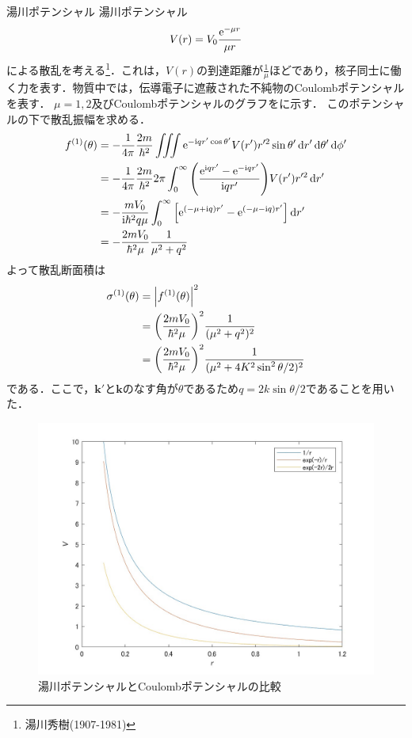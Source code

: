 \documentclass{report}
\begin{document}
 \begin{myex}{湯川ポテンシャル}{}
湯川ポテンシャル
\begin{align}
  V(r) = V_0 \frac{\mathrm{e}^{-\mu r}}{\mu r}
\end{align}
による散乱を考える\footnote{湯川秀樹(1907-1981)}．これは，$V(r)$の到達距離が$\frac{1}{\mu}$ほどであり，核子同士に働く力を表す．物質中では，伝導電子に遮蔽された不純物のCoulombポテンシャルを表す．
$\mu = 1,2$及びCoulombポテンシャルのグラフをに示す．
このポテンシャルの下で散乱振幅を求める．
\begin{align}
  f^{(1)}(\theta) &= -\frac{1}{4\pi} \frac{2m}{\hbar^2} \iiint \mathrm{e}^{-\mathrm{i} qr'\cos\theta'}V(r') r'^2 \sin\theta'\dd{r'}\dd{\theta'}\dd{\phi'}\\
  &= -\frac{1}{4\pi}\frac{2m}{\hbar^2} 2\pi \int_{0}^{\infty} \qty(\frac{\mathrm{e}^{\mathrm{i} qr'} - \mathrm{e}^{-\mathrm{i} qr'}}{\mathrm{i} qr'})V(r') r'^2 \dd{r'}\\
  &= -\frac{mV_0}{\mathrm{i} \hbar^2 q \mu} \int_{0}^{\infty} \qty[\mathrm{e}^{(-\mu + \mathrm{i} q)r'} - \mathrm{e}^{(-\mu - \mathrm{i} q)r'}] \dd{r'}\\
  &= - \frac{2m V_0}{\hbar^2 \mu} \frac{1}{\mu^2 + q^2}
\end{align}
よって散乱断面積は
\begin{align}
  \sigma^{(1)}(\theta) &= \abs{f^{(1)}(\theta)}^2\\
  &= \qty(\frac{2m V_0}{\hbar^2 \mu})^2 \frac{1}{(\mu^2 + q^2)^2}\\
  &= \qty(\frac{2m V_0}{\hbar^2 \mu})^2 \frac{1}{(\mu^2 + 4K^2 \sin^2\theta/2)^2}
\end{align}
である．ここで，$\bm{k'}$と$\bm{k}$のなす角が$\theta$であるため$q = 2k\sin\theta/2$であることを用いた．

\begin{figure}[H]
  \centering
  \includegraphics[width = 0.8\columnwidth]{fig/yukawa_potential.jpg}
  \caption{湯川ポテンシャルとCoulombポテンシャルの比較}\label{yukawa-potential-graph}
\end{figure}

 \end{myex}
\end{document}
